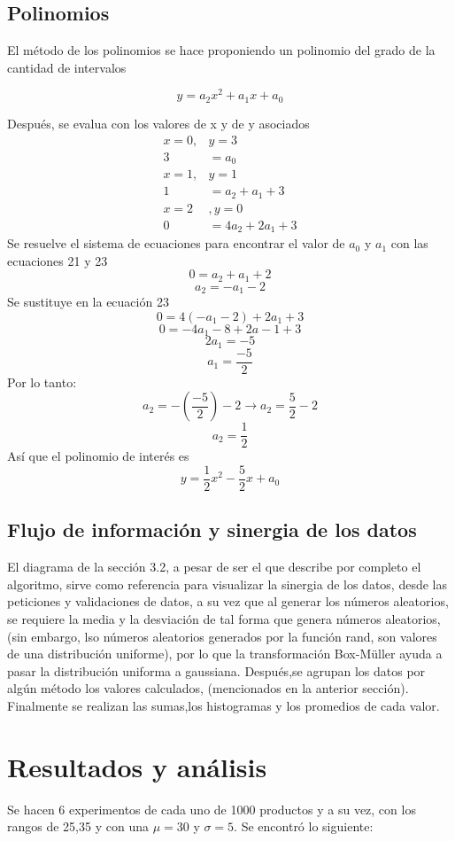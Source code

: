 \documentclass{article}
\begin{document}
\subsection*{Polinomios}
El método de los polinomios se hace proponiendo un polinomio del grado de la cantidad de intervalos 

\begin{equation}
    y=a_2x^2+a_1x+a_0
\end{equation}

Después, se evalua con los valores de x y de y asociados
\begin{align}
    x=0,& y=3 \\
    3 &= a_0 \\
    x=1,& y=1 \\
    1&=a_2+a_1+3\\
    x=2 &, y=0 \\
    0 &=4a_2+2a_1+3
\end{align}
Se resuelve el sistema de ecuaciones para encontrar el valor de $a_0$ y $a_1$ con las ecuaciones 21 y 23
$$0=a_2+a_1+2$$
$$a_2=-a_1-2$$
Se sustituye en la ecuación 23
$$ 0=4(-a_1-2)+2a_1+3$$
$$0=-4a_1-8+2a-1+3$$
$$2a_1=-5$$
$$a_1=\frac{-5}{2}$$
Por lo tanto:
$$a_2=-(\frac{-5}{2})-2 \rightarrow a_2=\frac{5}{2}-2$$
$$a_2=\frac{1}{2}$$
Así que el polinomio de interés es 
\begin{equation}
    y=\frac{1}{2}x^2-\frac{5}{2}x+a_0
\end{equation}
\subsection{Flujo de información y sinergia de los datos}
El diagrama de la sección 3.2, a pesar de ser el que describe por completo el algoritmo, sirve como referencia para visualizar la sinergia de los datos, desde las peticiones y validaciones de datos, a su vez que al generar los números aleatorios, se requiere la media y la desviación de tal forma que genera números aleatorios, (sin embargo, lso números aleatorios generados por la función rand, son valores de una distribución uniforme), por lo que la transformación Box-Müller ayuda a pasar la distribución uniforma a gaussiana. Después,se agrupan los datos por algún método los valores calculados, (mencionados en la anterior sección). Finalmente se realizan las sumas,los histogramas y los promedios de cada valor.
\section{Resultados y análisis} Se hacen 6 experimentos de cada uno de 1000 productos y a su vez, con los rangos de 25,35 y con una $\mu=30$ y $\sigma=5$. Se encontró lo siguiente:
\end{document}
